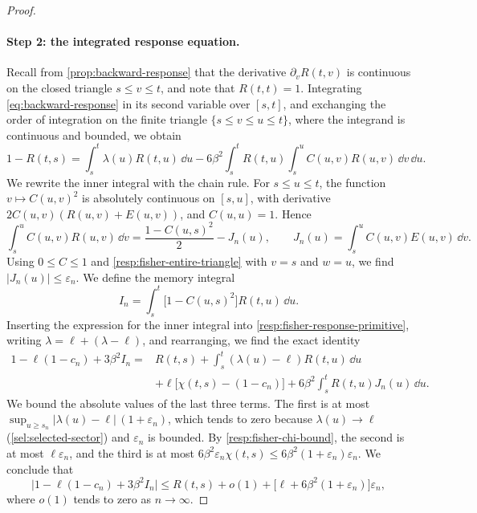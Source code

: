 \begin{proof}
\paragraph{Step 2: the integrated response equation.}
Recall from \cref{prop:backward-response} that the derivative $\partial_vR(t,v)$ is continuous on the closed triangle $s\le v\le t$, and note that $R(t,t)=1$. Integrating \eqref{eq:backward-response} in its second variable over $[s,t]$, and exchanging the order of integration on the finite triangle $\{s\le v\le u\le t\}$, where the integrand is continuous and bounded, we obtain
\begin{equation}
 1-R(t,s)=\int_s^t\lambda(u)R(t,u)\,\dd u
 -6\beta^2\int_s^tR(t,u)\int_s^uC(u,v)R(u,v)\,\dd v\,\dd u .
 \label{resp:fisher-response-primitive}
\end{equation}
We rewrite the inner integral with the chain rule. For $s\le u\le t$, the function $v\mapsto C(u,v)^2$ is absolutely continuous on $[s,u]$, with derivative $2C(u,v)(R(u,v)+E(u,v))$, and $C(u,u)=1$. Hence
\[
 \int_s^uC(u,v)R(u,v)\,\dd v=\frac{1-C(u,s)^2}2-J_n(u),
 \qquad J_n(u)=\int_s^uC(u,v)E(u,v)\,\dd v .
\]
Using $0\le C\le1$ and \eqref{resp:fisher-entire-triangle} with $v=s$ and $w=u$, we find $|J_n(u)|\le\varepsilon_n$. We define the memory integral
\begin{equation}\label{eq:fisher-cost-memory-integral}
 I_n=\int_s^t\bigl[1-C(u,s)^2\bigr]R(t,u)\,\dd u .
\end{equation}
Inserting the expression for the inner integral into \eqref{resp:fisher-response-primitive}, writing $\lambda=\ell+(\lambda-\ell)$, and rearranging, we find the exact identity
\begin{equation}\label{eq:fisher-cost-exact-rearrangement}
 \begin{split}
 1-\ell(1-c_n)+3\beta^2I_n
 ={}&R(t,s)+\int_s^t(\lambda(u)-\ell)R(t,u)\,\dd u\\
 &+\ell\bigl[\chi(t,s)-(1-c_n)\bigr]+6\beta^2\int_s^tR(t,u)J_n(u)\,\dd u .
 \end{split}
\end{equation}
We bound the absolute values of the last three terms. The first is at most $\sup_{u\ge s_n}|\lambda(u)-\ell|\,(1+\varepsilon_n)$, which tends to zero because $\lambda(u)\to\ell$ (\cref{sel:selected-sector}) and $\varepsilon_n$ is bounded. By \eqref{resp:fisher-chi-bound}, the second is at most $\ell\varepsilon_n$, and the third is at most $6\beta^2\varepsilon_n\chi(t,s)\le6\beta^2(1+\varepsilon_n)\varepsilon_n$. We conclude that
\begin{equation}
 \bigl|1-\ell(1-c_n)+3\beta^2I_n\bigr|
 \le R(t,s)+o(1)+\bigl[\ell+6\beta^2(1+\varepsilon_n)\bigr]\varepsilon_n,
 \label{resp:fisher-primitive-error}
\end{equation}
where $o(1)$ tends to zero as $n\to\infty$.


\end{proof}
